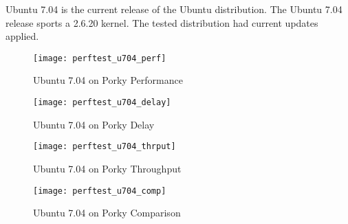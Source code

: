 \documentclass[letterpaper,final,notitlepage,twocolumn,10pt,twoside]{article}
\begin{document}
Ubuntu 7.04 is the current release of the Ubuntu distribution.  The Ubuntu
7.04 release sports a 2.6.20 kernel.  The tested distribution had current
updates applied.

\begin{figure}[p]
\texttt{[image: perftest\_u704\_perf]}
\caption[Ubuntu 7.04 on Porky Performance]{Ubuntu 7.04 on Porky Performance}
\label{figure:ubuntuperf}
\end{figure}

\begin{figure}[p]
\texttt{[image: perftest\_u704\_delay]}
\caption[Ubuntu 7.04 on Porky Delay]{Ubuntu 7.04 on Porky Delay}
\label{figure:ubuntudelay}
\end{figure}

\begin{figure}[p]
\texttt{[image: perftest\_u704\_thrput]}
\caption[Ubuntu 7.04 on Porky Throughput]{Ubuntu 7.04 on Porky Throughput}
\label{figure:ubuntuthrput}
\end{figure}

\begin{figure}[p]
\texttt{[image: perftest\_u704\_comp]}
\caption[Ubuntu 7.04 on Porky Comparison]{Ubuntu 7.04 on Porky Comparison}
\label{figure:ubuntucomp}
\end{figure}
\end{document}
